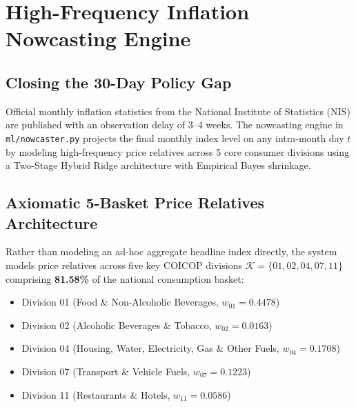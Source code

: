 \documentclass[11pt,a4paper]{article}
\begin{document}
\newpage

\section{High-Frequency Inflation Nowcasting Engine}

\subsection{Closing the 30-Day Policy Gap}
Official monthly inflation statistics from the National Institute of Statistics (NIS) are published with an observation delay of 3--4 weeks. The nowcasting engine in \texttt{ml/nowcaster.py} projects the final monthly index level on any intra-month day $t$ by modeling high-frequency price relatives across 5 core consumer divisions using a Two-Stage Hybrid Ridge architecture with Empirical Bayes shrinkage.

\subsection{Axiomatic 5-Basket Price Relatives Architecture}
Rather than modeling an ad-hoc aggregate headline index directly, the system models price relatives across five key COICOP divisions $\mathcal{K} = \{01, 02, 04, 07, 11\}$ comprising \textbf{81.58\%} of the national consumption basket:
\begin{itemize}
    \item Division 01 (Food \& Non-Alcoholic Beverages, $w_{01} = 0.4478$)
    \item Division 02 (Alcoholic Beverages \& Tobacco, $w_{02} = 0.0163$)
    \item Division 04 (Housing, Water, Electricity, Gas \& Other Fuels, $w_{04} = 0.1708$)
    \item Division 07 (Transport \& Vehicle Fuels, $w_{07} = 0.1223$)
    \item Division 11 (Restaurants \& Hotels, $w_{11} = 0.0586$)
\end{itemize}
\end{document}
